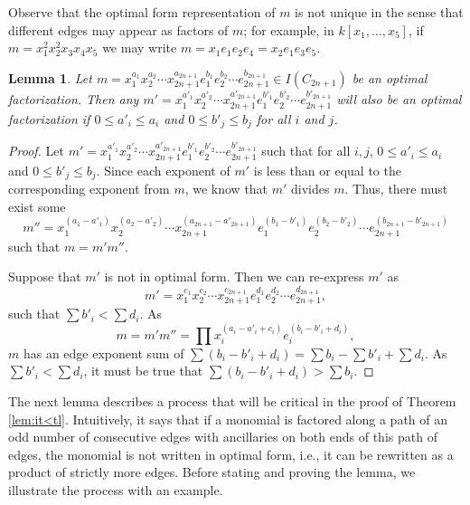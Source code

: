 \documentclass[12pt]{amsart}
\renewcommand{\leq}{\leqslant}
\theoremstyle{plain}
\newtheorem{lem}[theorem]{Lemma}
\theoremstyle{definition}
\begin{document}
Observe that the optimal form representation of $m$ is not unique in the sense that different edges may appear as factors of $m$; for example, in $k[x_1,\ldots,x_5]$, if $m = x_1^2 x_2^2 x_3 x_4 x_5$ we may write $m = x_1 e_1 e_2 e_4 = x_2 e_1 e_3 e_5$.



\begin{lem}\label{lem:splitm}
Let $m = x_1^{a_1} x_2^{a_2} \cdots x_{2n+1}^{a_{2n+1}} e_1^{b_1} e_2^{b_2} \cdots e_{2n+1}^{b_{2n+1}} \in I(C_{2n+1})$ be an optimal factorization. %
Then any $m' =  x_1^{a'_1} x_2^{a'_2} \cdots x_{2n+1}^{a'_{2n+1}} e_1^{b'_1} e_2^{b'_2} \cdots e_{2n+1}^{b'_{2n+1}}$ will also be an optimal factorization if $0 \leq a'_i \leq a_i$ and $0 \leq b'_j \leq b_j$ for all $i$ and $j$.
\end{lem}

\begin{proof}
Let $m' =  x_1^{a'_1} x_2^{a'_2} \cdots x_{2n+1}^{a'_{2n+1}} e_1^{b'_1} e_2^{b'_2} \cdots e_{2n+1}^{b'_{2n+1}}$ such that for all $i,j$, $0 \leq a'_i \leq a_i$ and $0 \leq b'_j \leq b_j$. 
Since each exponent of $m'$ is less than or equal to the corresponding exponent from $m$, we know that $m'$ divides $m$. 
Thus, there must exist some 
\[
	m'' = x_1^{(a_1-a'_1)} x_2^{(a_2-a'_2)} \cdots x_{2n+1}^{(a_{2n+1}-a'_{2n+1})} e_1^{(b_1-b'_1)} e_2^{(b_2-b'_2)} \cdots e_{2n+1}^{(b_{2n+1}-b'_{2n+1})}
\] 
such that $m = m'm''$.

Suppose that $m'$ is not in optimal form. 
Then we can re-express $m'$ as 
\[
m'=x_1^{c_1} x_2^{c_2} \cdots x_{2n+1}^{c_{2n+1}} e_1^{d_1} e_2^{d_2} \cdots e_{2n+1}^{d_{2n+1}},
\] 
such that $\sum b'_i < \sum d_i$. 
As $$m = m'm'' = \prod  x_i^{(a_i-a'_i+c_i)} e_i^{(b_i-b'_i+d_i)},$$ $m$ has an edge exponent sum of $\sum (b_i-b'_i+d_i) = \sum b_i - \sum b'_i + \sum d_i$. 
As $\sum b'_i < \sum d_i$, it must be true that $ \sum (b_i-b'_i+d_i) > \sum b_i$.

\end{proof}

The next lemma describes a process that will be critical in the proof of Theorem \ref{lem:it<tl}.
Intuitively, it says that if a monomial is factored along a path of an odd number of consecutive edges with ancillaries on both ends of this path of edges, the monomial is not written in optimal form, i.e., it can be rewritten as a product of strictly more edges.
Before stating and proving the lemma, we illustrate the process with an example.
\end{document}
